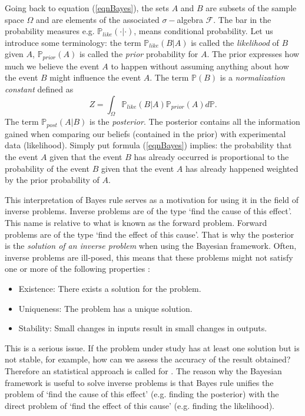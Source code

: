 \documentclass[12pt]{book}
\newcommand{\post}{\mathbb{P}_{post}}
\newcommand{\like}{\mathbb{P}_{like}}
\newcommand{\prior}{\mathbb{P}_{prior}}
\newcommand{\p}{\mathbb{P}}
\begin{document}
Going back to equation (\ref{eqnBayes}), the sets $A$ and $B$ are subsets of the sample space $\Omega$ and 
are elements of the associated $\sigma-$algebra $\mathscr{F}$. The bar in the probability
measures e.g. $\like(\cdot|\cdot)$, means conditional probability. Let us introduce some terminology:
 the term $\like(B|A)$ is called the \textit{likelihood} of $B$ given $A$, $\prior(A)$ is called the 
\textit{prior} probability for $A$. The prior expresses how much we believe the event $A$ to happen without assuming
anything about how the event $B$ might influence the event $A$. 
The term $\p(B)$ is a \textit{normalization constant} defined as 
\begin{equation*}
Z=\int_{\Omega} \like(B|A)\prior(A)d\p.
\end{equation*}
The term $\post(A|B)$ is  the \textit{posterior}. The posterior contains all the information 
gained when comparing our beliefs (contained in the prior) with experimental data (likelihood). 
Simply put  formula (\ref{eqnBayes}) implies: the probability that the event $A$ given that
the event $B$ has already occurred is proportional to the probability of the event $B$ given
that the event $A$ has already happened weighted by the prior probability of $A$.
\newline



This interpretation of Bayes rule serves as a motivation for using it in the field of inverse problems. 
Inverse problems are  of the type `find the cause of this effect'. This name is relative to what is known
as the forward problem. Forward problems are  of the type `find the effect of this cause'. That is why
the posterior
is the \textit{solution of an inverse problem} when using the  Bayesian framework.
Often, inverse problems
are ill-posed, this means
that these problems might  not satisfy one or more of the following properties \cite{lebedev2012functional}:
\begin{itemize}
\item Existence: There exists a solution for the problem.
\item Uniqueness: The problem has a unique solution.
\item Stability: Small changes in inputs result in small changes in outputs.
\end{itemize}
This is a serious issue. If the problem under study has at least one solution but  is not stable, for example, 
how can we assess the accuracy of the result obtained? Therefore an statistical approach is called for 
. The reason why the Bayesian framework is useful to solve inverse problems
is that Bayes rule unifies the problem of `find the cause of this effect' (e.g. finding the posterior)
with the direct problem of `find the effect of this cause' (e.g. finding the likelihood).
\end{document}
